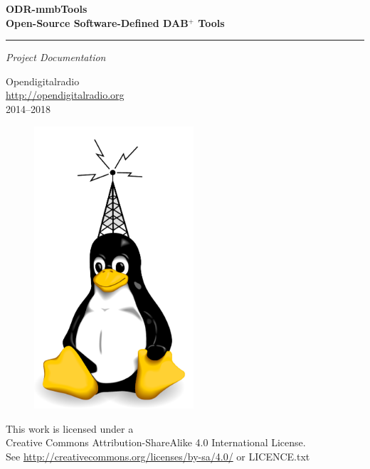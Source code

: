 \documentclass[a4paper,oneside,10pt]{article}
\newcommand{\dabplus}{DAB$^\mathrm{+}$\xspace}
\newcommand{\titleinfo}{ODR-mmbTools \\
Open-Source Software-Defined \dabplus Tools}
\begin{document}
 \begin{titlepage}
    \null\vfil
    \begin{flushleft}
      \huge \textbf{\titleinfo}
    \end{flushleft}
    \par
    \hrule height 4pt
    \par
    \begin{flushright}
      \large
      \textsl{Project Documentation} \par
    \end{flushright}
    \vspace{\fill}

    \begin{center}
        \Large
        Opendigitalradio\\\href{http://opendigitalradio.org}{http://opendigitalradio.org}\\2014--2018
    \end{center}
    \vspace{\fill}

    \begin{figure}[!h]
        \centering
        \parbox{2.2in}{\includegraphics[width=16em]{figures/dabtux.pdf}}
    \end{figure}

    \vspace*{1cm}
    \begin{center}
    This work is licensed under a \\
    Creative Commons Attribution-ShareAlike 4.0 International License.\\
    See \url{http://creativecommons.org/licenses/by-sa/4.0/} or LICENCE.txt
    \end{center}
 \end{titlepage}
\end{document}
